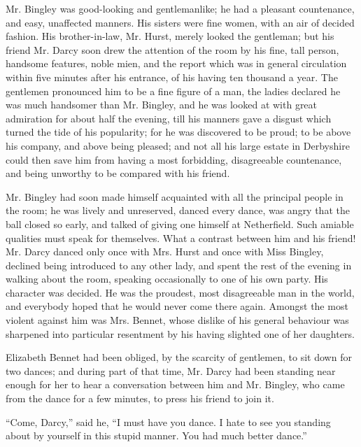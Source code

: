       Mr. Bingley was good-looking and gentlemanlike; he had a pleasant
      countenance, and easy, unaffected manners. His sisters were fine
      women, with an air of decided fashion. His brother-in-law, Mr.
      Hurst, merely looked the gentleman; but his friend Mr. Darcy soon
      drew the attention of the room by his fine, tall person, handsome
      features, noble mien, and the report which was in general
      circulation within five minutes after his entrance, of his having
      ten thousand a year. The gentlemen pronounced him to be a fine
      figure of a man, the ladies declared he was much handsomer than
      Mr. Bingley, and he was looked at with great admiration for about
      half the evening, till his manners gave a disgust which turned
      the tide of his popularity; for he was discovered to be proud; to
      be above his company, and above being pleased; and not all his
      large estate in Derbyshire could then save him from having a most
      forbidding, disagreeable countenance, and being unworthy to be
      compared with his friend.

      Mr. Bingley had soon made himself acquainted with all the
      principal people in the room; he was lively and unreserved,
      danced every dance, was angry that the ball closed so early, and
      talked of giving one himself at Netherfield. Such amiable
      qualities must speak for themselves. What a contrast between him
      and his friend! Mr. Darcy danced only once with Mrs. Hurst and
      once with Miss Bingley, declined being introduced to any other
      lady, and spent the rest of the evening in walking about the
      room, speaking occasionally to one of his own party. His
      character was decided. He was the proudest, most disagreeable man
      in the world, and everybody hoped that he would never come there
      again. Amongst the most violent against him was Mrs. Bennet,
      whose dislike of his general behaviour was sharpened into
      particular resentment by his having slighted one of her
      daughters.

      Elizabeth Bennet had been obliged, by the scarcity of gentlemen,
      to sit down for two dances; and during part of that time, Mr.
      Darcy had been standing near enough for her to hear a
      conversation between him and Mr. Bingley, who came from the dance
      for a few minutes, to press his friend to join it.

      “Come, Darcy,” said he, “I must have you dance. I hate to see you
      standing about by yourself in this stupid manner. You had much
      better dance.”

